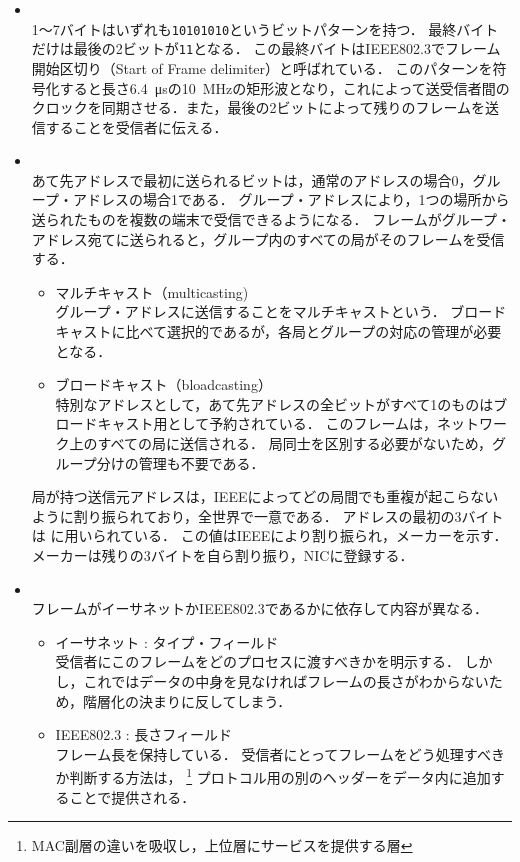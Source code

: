 \documentclass[a4paper]{ltjsarticle}
\begin{document}
\begin{itemize}
\item
  \\
  1〜7バイトはいずれも\texttt{10101010}というビットパターンを持つ．
  最終バイトだけは最後の2ビットが\texttt{11}となる．
  この最終バイトはIEEE802.3でフレーム開始区切り（Start of Frame
  delimiter）と呼ばれている．
  このパターンを符号化すると長さ\SI{6.4}{\micro s}の\SI{10}{MHz}の矩形波となり，これによって送受信者間のクロックを同期させる．また，最後の2ビットによって残りのフレームを送信することを受信者に伝える．
\item
  \\
  あて先アドレスで最初に送られるビットは，通常のアドレスの場合0，グループ・アドレスの場合1である．
  グループ・アドレスにより，1つの場所から送られたものを複数の端末で受信できるようになる．
  フレームがグループ・アドレス宛てに送られると，グループ内のすべての局がそのフレームを受信する．

  \newpage
  \begin{itemize}
  \item
    マルチキャスト（multicasting)\\
    グループ・アドレスに送信することをマルチキャストという．
    ブロードキャストに比べて選択的であるが，各局とグループの対応の管理が必要となる．
  \item
    ブロードキャスト（bloadcasting）\\
    特別なアドレスとして，あて先アドレスの全ビットがすべて1のものはブロードキャスト用として予約されている．
    このフレームは，ネットワーク上のすべての局に送信される．
    局同士を区別する必要がないため，グループ分けの管理も不要である．
  \end{itemize}

  局が持つ送信元アドレスは，IEEEによってどの局間でも重複が起こらないように割り振られており，全世界で一意である．
  アドレスの最初の3バイトは  に用いられている．
  この値はIEEEにより割り振られ，メーカーを示す．
  メーカーは残りの3バイトを自ら割り振り，NICに登録する．
\item
  \\
  フレームがイーサネットかIEEE802.3であるかに依存して内容が異なる．

  \begin{itemize}

  \item
    イーサネット : タイプ・フィールド\\
    受信者にこのフレームをどのプロセスに渡すべきかを明示する．
    しかし，これではデータの中身を見なければフレームの長さがわからないため，階層化の決まりに反してしまう．
  \item
    IEEE802.3 : 長さフィールド\\
    フレーム長を保持している．
    受信者にとってフレームをどう処理すべきか判断する方法は，
    \footnote{MAC副層の違いを吸収し，上位層にサービスを提供する層}
    プロトコル用の別のヘッダーをデータ内に追加することで提供される．
  \end{itemize}


\end{itemize}
\end{document}
